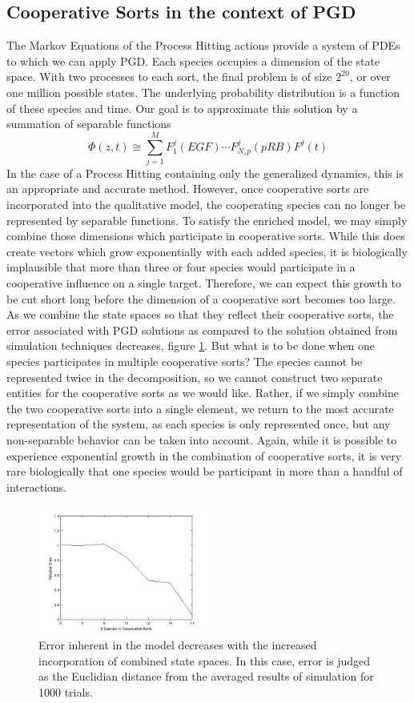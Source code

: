 \documentclass{article}
\begin{document}
\subsection{Cooperative Sorts in the context of PGD}
The Markov Equations of the Process Hitting actions provide a system of PDEs to which we can apply PGD. Each species occupies a dimension of the state space. With two processes to each sort, the final problem is of size $2^{20}$, or over one million possible states. The underlying probability distribution is a function of these species and time. Our goal is to approximate this solution by a summation of separable functions 
\[
 \Phi(z,t)\cong \sum_{j=1}^{M}F_1^j(EGF)\cdots F_{N_sp}^j(pRB) F^j(t)
\]
 In the case of a Process Hitting containing only the generalized dynamics, this is an appropriate and accurate method. However, once cooperative sorts are incorporated into the qualitative model, the cooperating species can no longer be represented by separable functions. To satisfy the enriched model, we may simply combine those dimensions which participate in cooperative sorts. While this does create vectors which grow exponentially with each added species, it is biologically implausible that more than three or four species would participate in a cooperative influence on a single target. Therefore, we can expect this growth to be cut short long before the dimension of a cooperative sort becomes too large. As we combine the state spaces so that they reflect their cooperative sorts, the error associated with PGD solutions as compared to the solution obtained from simulation techniques decreases, figure \ref{error_coop}. But what is to be done when one species participates in multiple cooperative sorts? The species cannot be represented twice in the decomposition, so we cannot construct two separate entities for the cooperative sorts as we would like. Rather, if we simply combine the two cooperative sorts into a single element, we return to the most accurate representation of the system, as each species is only represented once, but any non-separable behavior can be taken into account. Again, while it is possible to experience exponential growth in the combination of cooperative sorts, it is very rare biologically that one species would be participant in more than a handful of interactions.\\
 
\begin{figure}[h!]
\centering
 \includegraphics[width=0.5\textwidth]{relative_error.jpg}
 \caption{Error inherent in the model decreases with the increased incorporation of combined state spaces. In this case, error is judged as the Euclidian distance from the averaged results of simulation for 1000 trials.}
 \label{error_coop}
\end{figure}
\end{document}
